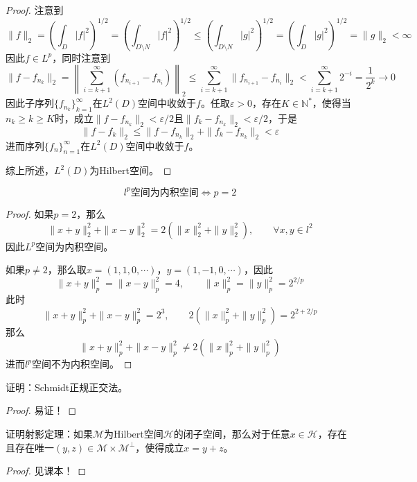 \documentclass[lang = cn, scheme = chinese, 10pt]{elegantbook}
\newcommand{\N}{\mathbb{N}}  %
\begin{document}
\begin{proof}
	注意到
	$$
	\|f\|_2
	=\left( \int_{D}|f|^2 \right)^{1/2}
	=\left( \int_{D\setminus N}|f|^2 \right)^{1/2}
	\le \left( \int_{D\setminus N}|g|^2 \right)^{1/2}
	=\left( \int_{D}|g|^2 \right)^{1/2}
	=\|g\|_2<\infty
	$$
	因此$f\in L^p$，同时注意到
	$$
	\| f-f_{n_k} \|_2
	=\left\| \sum_{i=k+1}^{\infty}(f_{n_{i+1}}-f_{n_i}) \right\|_2
	\le \sum_{i=k+1}^{\infty}\| f_{n_{i+1}}-f_{n_i} \|_2
	< \sum_{i=k+1}^{\infty}2^{-i}=\frac{1}{2^k}\to0
	$$
	因此子序列$\{f_{n_k}\}_{k=1}^{\infty}$在$L^2(D)$空间中收敛于$f$。任取$\varepsilon>0$，存在$K\in\N^*$，使得当$n_k\ge k\ge K$时，成立$\|f-f_{n_k}\|_2<\varepsilon/2$且$\|f_k-f_{n_k}\|_2<\varepsilon/2$，于是
	$$
	\|f-f_k\|_2\le\|f-f_{n_k}\|_2+\|f_k-f_{n_k}\|_2<\varepsilon
	$$
	进而序列$\{f_n\}_{n=1}^{\infty}$在$L^2(D)$空间中收敛于$f$。
	
	综上所述，$L^2(D)$为Hilbert空间。
\end{proof}

\begin{proposition}
	$$
	l^p\text{空间为内积空间}\iff p=2
	$$
\end{proposition}

\begin{proof}
	如果$p=2$，那么
	$$
	\|x+y\|_2^2+\|x-y\|_2^2=2(\|x\|_2^2+\|y\|_2^2),\qquad \forall x,y\in l^2
	$$
	因此$L^p$空间为内积空间。
	
	如果$p\ne 2$，那么取$x=(1,1,0,\cdots)$，$y=(1,-1,0,\cdots)$，因此
	$$
	\|x+y\|_p^2=\|x-y\|_p^2=4,\qquad 
	\|x\|_p^2=\|y\|_p^2=2^{2/p}
	$$
	此时
	$$
	\|x+y\|_p^2+\|x-y\|_p^2=2^3,\qquad 
	2(\|x\|_p^2+\|y\|_p^2)=2^{2+2/p}
	$$
	那么
	$$
	\|x+y\|_p^2+\|x-y\|_p^2\ne 
	2(\|x\|_p^2+\|y\|_p^2)
	$$
	进而$l^p$空间不为内积空间。
\end{proof}

\begin{proposition}
	证明：Schmidt正规正交法。
\end{proposition}

\begin{proof}
	易证！
\end{proof}

\begin{proposition}
	证明射影定理：如果$\mathcal{M}$为Hilbert空间$\mathcal{H}$的闭子空间，那么对于任意$x\in \mathcal{H}$，存在且存在唯一$(y,z)\in\mathcal{M}\times\mathcal{M}^\perp$，使得成立$x=y+z$。
\end{proposition}

\begin{proof}
	见课本！
\end{proof}
\end{document}
